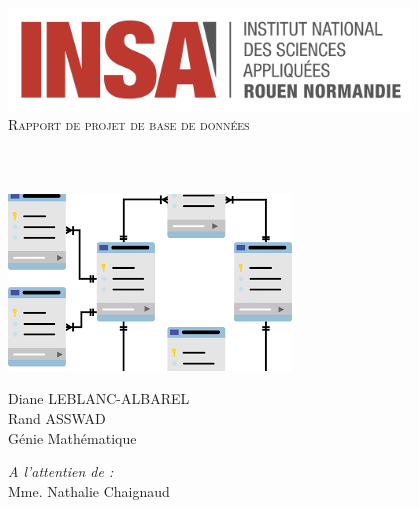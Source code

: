 \begin{titlepage}
    \begin{sffamily}
        \begin{center}
            \includegraphics[width=0.8\textwidth]{img/logo}\\[2cm]

            \textsc{\huge Rapport de projet de base de données}\\[1cm]

            \HRule \\[0.4cm]
            {\huge \bfseries \@title \\[0.4cm]}
            \HRule \\[3cm]

            \includegraphics[width=.6\textwidth]{img/cover_img}~\\[2cm]

            \begin{minipage}{0.4\textwidth}
            \begin{flushleft} \large
                Diane LEBLANC-ALBAREL\\
                Rand ASSWAD\\
                Génie Mathématique
            \end{flushleft}
            \end{minipage}
            \begin{minipage}{0.4\textwidth}
            \begin{flushright} \large
                \emph{A l'attentien de :}\\
                Mme. Nathalie Chaignaud
            \end{flushright}
            \end{minipage}

            \vfill
            {\large \@date}
        \end{center}
    \end{sffamily}
\end{titlepage}
\makeatother
